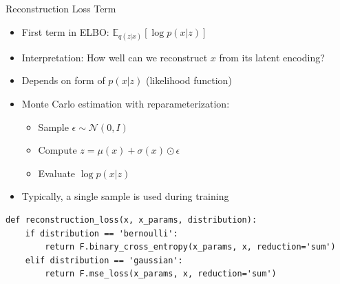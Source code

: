 \documentclass[5pt,aspectratio=169]{beamer}
\begin{document}
\begin{frame}{Reconstruction Loss Term}
\begin{itemize}
\item First term in ELBO: $\mathbb{E}_{q(z|x)}[\log p(x|z)]$
\item Interpretation: How well can we reconstruct $x$ from its latent encoding?
\item Depends on form of $p(x|z)$ (likelihood function)
\item Monte Carlo estimation with reparameterization:
  \begin{itemize}
  \item Sample $\epsilon \sim \mathcal{N}(0, I)$
  \item Compute $z = \mu(x) + \sigma(x) \odot \epsilon$
  \item Evaluate $\log p(x|z)$
  \end{itemize}
\item Typically, a single sample is used during training
\end{itemize}

\begin{center}

\end{center}
\end{frame}

\begin{frame}[fragile]
\centering
\begin{lstlisting}
def reconstruction_loss(x, x_params, distribution):
    if distribution == 'bernoulli':
        return F.binary_cross_entropy(x_params, x, reduction='sum')
    elif distribution == 'gaussian':
        return F.mse_loss(x_params, x, reduction='sum')
\end{lstlisting}
\end{frame}
\end{document}

